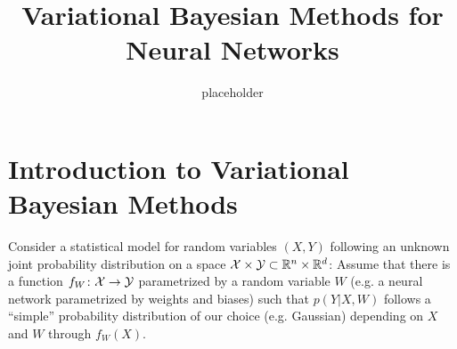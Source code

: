 \documentclass[10pt, a4paper]{article}
\title{Variational Bayesian Methods for Neural Networks}
\author{placeholder}
\begin{document}
\maketitle

\section{Introduction to Variational Bayesian Methods}
Consider a statistical model for random variables $(X,Y)$ following an
unknown joint probability distribution on a space $\mathcal{X}\times\mathcal{Y}\subset\mathbb{R}^n\times\mathbb{R}^d$: Assume
that there is a function $f_W\colon\mathcal{X}\to\mathcal{Y}$ parametrized by a random variable $W$ (e.g. a neural network
parametrized by weights and biases) such that $p(Y\vert X,W)$ follows
a ``simple'' probability distribution of our choice (e.g. Gaussian) depending on $X$ and $W$ through $f_W(X)$.
\end{document}
